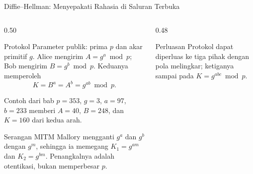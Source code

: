 \documentclass[aspectratio=169,11pt]{beamer}
\begin{document}
\begin{frame}{Diffie--Hellman: Menyepakati Rahasia di Saluran Terbuka}
    \scriptsize
    \begin{columns}[T,onlytextwidth]
        \begin{column}{0.50\textwidth}
            \begin{block}{Protokol}
                Parameter publik: prima $p$ dan akar primitif $g$.
                Alice mengirim $A=g^{a}\bmod p$; Bob mengirim
                $B=g^{b}\bmod p$. Keduanya memperoleh
                \[
                    K=B^{a}=A^{b}=g^{ab}\bmod p.
                \]
            \end{block}
            \begin{exampleblock}{Contoh dari bab}
                $p=353$, $g=3$, $a=97$, $b=233$ memberi
                $A=40$, $B=248$, dan $K=160$ dari kedua arah.
            \end{exampleblock}
            \begin{alertblock}{Serangan MITM}
                Mallory mengganti $g^{a}$ dan $g^{b}$ dengan $g^{m}$, sehingga
                ia memegang $K_1=g^{am}$ dan $K_2=g^{bm}$. Penangkalnya adalah
                otentikasi, bukan memperbesar $p$.
            \end{alertblock}
        \end{column}
        \begin{column}{0.48\textwidth}
            \centering
            \vspace{0.1cm}
            \begin{block}{Perluasan}
                \footnotesize
                Protokol dapat diperluas ke tiga pihak dengan pola melingkar;
                ketiganya sampai pada $K=g^{abc}\bmod p$.
            \end{block}
        \end{column}
    \end{columns}
\end{frame}
\end{document}
